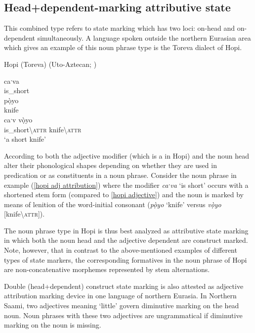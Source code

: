 \subsection{Head+dependent\hyp{}marking attributive state}
This combined type refers to state marking which has two loci: on-head and on-dependent simultaneously. A language spoken outside the northern Eurasian area which gives an example of this noun phrase type is the Toreva dialect of Hopi.
\begin{exe}
\ex 
{\rm Hopi (Toreva) (Uto-Aztecan; \citealt{whorf1946})}
\begin{xlist}
\ex
\label{hopi adjective}
\gll caˑva\\
	is\_short\\
\ex	
\gll pọ̀yo\\
	knife\\
\ex
\label{hopi adj attribution}
\gll caˑv vọ̀yo\\
 	is\_short\textbackslash\textsc{attr} knife\textbackslash\textsc{attr}\\
\glt	‘a short knife’
\end{xlist}
\end{exe}
According to \citet[178]{whorf1946} both the adjective modifier (which is a  in Hopi) and the noun head alter their phonological shapes depending on whether they are used in predication or as constituents in a noun phrase. Consider the noun phrase in example (\ref{hopi adj attribution}) where the modifier \textit{caˑva} ‘is short’ occurs with a shortened stem form (compared to \ref{hopi adjective}) and the noun is marked by means of lenition of the word-initial consonant (\textit{pọ̀yo} ‘knife’ versus \textit{vọ̀yo} [knife\textbackslash\textsc{attr}]).

The noun phrase type in Hopi is thus best analyzed as attributive state marking in which both the noun head and the adjective dependent are construct marked. Note, however, that in contrast to the above-mentioned examples of different types of state markers, the corresponding formatives in the noun phrase of Hopi are non-concatenative morphemes represented by stem alternations.

Double (head+dependent) construct state marking is also attested as adjective attribution marking device in one language of northern Eurasia. In Northern Saami, two adjectives meaning ‘little’ govern diminutive marking on the head noun. Noun phrases with these two adjectives are ungrammatical if diminutive marking on the noun is missing.
\newpage

